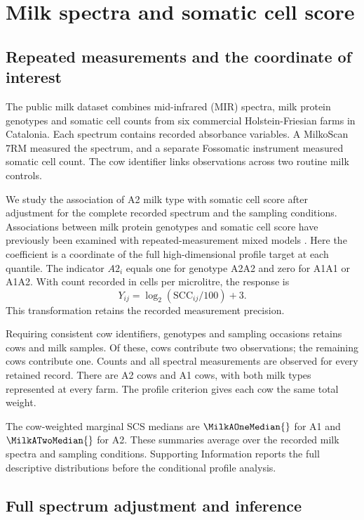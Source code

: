 \section{Milk spectra and somatic cell score}\label{sec:application}

\subsection{Repeated measurements and the coordinate of interest}

The public milk dataset \cite{chirife2025data} combines mid-infrared (MIR)
spectra, milk protein genotypes and somatic cell counts from six
commercial Holstein-Friesian farms in Catalonia. Each spectrum
contains \MilkSpectra{} recorded absorbance variables. A MilkoScan
7RM measured the spectrum, and a separate Fossomatic instrument
measured somatic cell count. The cow identifier links observations
across two routine milk controls.

We study the association of A2 milk type with somatic cell score
after adjustment for the complete recorded spectrum and the sampling
conditions. Associations between milk protein genotypes and somatic
cell score have previously been examined with repeated-measurement
mixed models \cite{citek2022}. Here the coefficient is a coordinate
of the full high-dimensional profile target at each quantile.
The indicator $A2_i$ equals one for genotype A2A2 and zero for
A1A1 or A1A2. With count recorded in cells per microlitre, the
response is
\[
 Y_{ij}=\log_2(\mathrm{SCC}_{ij}/100)+3.
\]
This transformation retains the recorded measurement precision.

Requiring consistent cow identifiers, genotypes and sampling occasions
retains \MilkCows{} cows and \MilkSamples{} milk samples. Of these,
\MilkRepeatCows{} cows contribute two observations; the remaining cows
contribute one. Counts and all spectral measurements are observed for
every retained record. There are \MilkATwoCows{} A2 cows and
\MilkAOneCows{} A1 cows, with both milk types represented at every farm.
The profile criterion gives each cow the same total weight.

The cow-weighted marginal SCS medians are $\MilkAOneMedian{}$ for A1
and $\MilkATwoMedian{}$ for A2. These summaries average over the
recorded milk spectra and sampling conditions. Supporting Information
reports the full descriptive distributions before the conditional
profile analysis.

\subsection{Full spectrum adjustment and inference}

